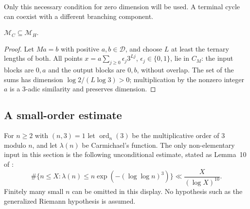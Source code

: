 Only this necessary condition for zero dimension will be used. A
terminal cycle can coexist with a different branching component.

\begin{lemma}\label{lem:pd-inclusion}
$\mathcal M_C\subseteq\mathcal M_H$.
\end{lemma}
\begin{proof}
Let $Ma=b$ with positive $a,b\in\mathcal D$, and choose $L$ at least
the ternary lengths of both. All points
$x=a\sum_{j\geq0}\epsilon_j3^{Lj}$, $\epsilon_j\in\{0,1\}$, lie in
$C_M$: the input blocks are $0,a$ and the output blocks are $0,b$,
without overlap. The set of the sums has dimension
$\log2/(L\log3)>0$; multiplication by the nonzero integer $a$ is a
$3$-adic similarity and preserves dimension.
\end{proof}

\subsection{A small-order estimate}

For $n\geq2$ with $(n,3)=1$ let $\operatorname{ord}_n(3)$ be the multiplicative order
of $3$ modulo $n$, and let $\lambda(n)$ be Carmichael's function.
The only non-elementary input in this section is the following
unconditional estimate, stated as Lemma~10 of \cite{KP2005}:
\begin{equation}\label{eq:pd-kp}
 \#\{n\leq X:\lambda(n)\leq n\exp(- (\log\log n)^3)\}
       \ll\frac{X}{(\log X)^{10}}.
\end{equation}
Finitely many small $n$ can be omitted in this display. No hypothesis
such as the generalized Riemann hypothesis is assumed.

